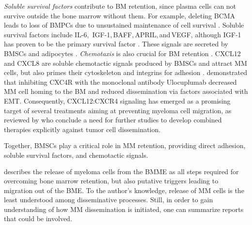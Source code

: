 \emph{Soluble survival factors} contribute to \ac{BM} retention, since plasma
cells can not survive outside the bone marrow without them. For example,
deleting BCMA  leads to loss of
\acp{BMPC}  due to unsustained maintenance of cell survival
\cite{oconnorBCMAEssentialSurvival2004}. Soluble survival factors include IL-6,\,
IGF-1,\,BAFF,\,APRIL,\,and\,VEGF, although IGF-1 has proven to be the primary
survival factor \cite{sprynskiRoleIGF1Major2009}. These signals are secreted by
\acp{BMSC} and adipocytes \cite{kiblerAdhesiveInteractionsHuman1998,
    garcia-ortizRoleTumorMicroenvironment2021}. \emph{Chemotaxis} is also crucial
for \ac{BM} retention \cite{ullahRoleCXCR4Multiple2019}. CXCL12 and CXCL8 are
soluble chemotactic signals produced by \acp{BMSC} and attract \ac{MM} cells,
but also primes their cytoskeleton and integrins for adhesion
\cite{aggarwalChemokinesMultipleMyeloma2006,
    alsayedMechanismsRegulationCXCR42007}.
\citet{roccaroCXCR4RegulatesExtraMedullary2015} demonstrated that inhibiting
CXC4R  with the monoclonal antibody
Ulocuplumab decreased \ac{MM} cell homing to the \ac{BM} and reduced
dissemination via factors associated with \ac{EMT}. Consequently, CXCL12:CXCR4
signaling has emerged as a promising target of several treatments aiming at
preventing myeloma cell migration, as reviewed by
\citet{itoRoleTherapeuticTargeting2021} who conclude a need for further studies
to develop combined therapies explicitly against tumor cell dissemination.

Together, \acp{BMSC} play a critical role in \ac{MM} retention, providing direct
adhesion, soluble survival factors, and chemotactic signals.


%
\label{sec:intro_myeloma_release}%
\citet{zeissigTumourDisseminationMultiple2020} describes the release of myeloma
cells from the \ac{BMME} as all steps required for overcoming bone marrow
retention, but also putative triggers leading to migration out of the BME. To
the author's knowledge, release of \ac{MM} cells is the least understood among
disseminative processes. Still, in order to gain understanding of how \ac{MM}
dissemination is initiated, one can summarize reports that could be involved.


